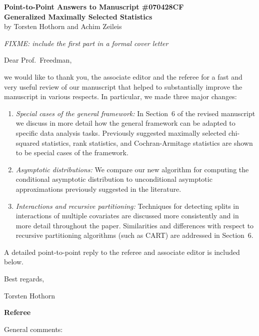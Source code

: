 \documentclass[11pt,a4paper]{article}
\begin{document}
\begin{center}
\textbf{\large Point-to-Point Answers to Manuscript \#070428CF \\
Generalized Maximally Selected Statistics} \\
by Torsten Hothorn and Achim Zeileis
\end{center}

\textit{FIXME: include the first part in a formal cover letter}

Dear Prof.~Freedman,

we would like to thank you, the associate editor and the referee
for a fast and very useful review of our manuscript that helped to 
substantially improve the manuscript in various respects. In particular,
we made three major changes:

\begin{enumerate}
  \item \textit{Special cases of the general framework:} In Section~6
        of the revised manuscript we discuss in more detail how the general
	framework can be adapted to specific data analysis tasks.
	Previously suggested maximally selected chi-squared statistics,
	rank statistics, and Cochran-Armitage statistics are shown to
	be special cases of the framework.
  \item \textit{Asymptotic distributions:} We compare our new algorithm
        for computing the conditional asymptotic distribution to unconditional
	asymptotic approximations previously suggested in the literature.
  \item \textit{Interactions and recursive partitioning:} Techniques for
        detecting splits in interactions of multiple covariates are
	discussed more consistently and in more detail throughout the paper.
	Similarities and differences with respect to recursive partitioning
	algorithms (such as CART) are addressed in Section~6.  
\end{enumerate}

A detailed point-to-point reply to the referee and associate editor is included below.

Best regards,

Torsten Hothorn


\vspace*{1cm}

\textbf{\large Referee}

General comments:
\end{document}
